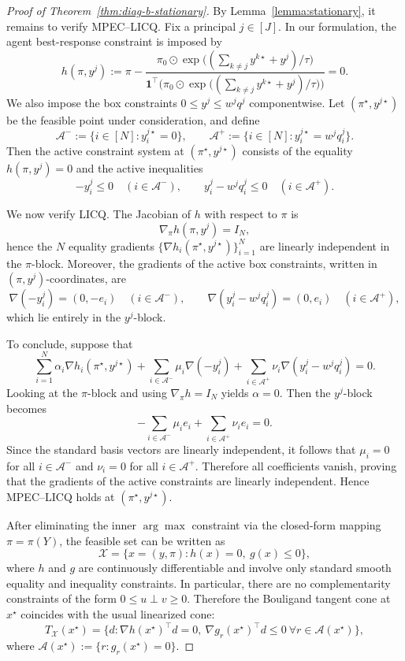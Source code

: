 \documentclass{article}
\begin{document}
\begin{proof}[Proof of Theorem~\ref{thm:diag-b-stationary}]
By Lemma~\ref{lemma:stationary}, it remains to verify MPEC--LICQ.
Fix a principal \(j\in[J]\). In our formulation, the agent best-response constraint is imposed by
\[
h(\pi,y^j)
:= \pi -
\frac{\pi_0\odot \exp\!\big((\sum_{k\neq j} y^{k\star}+y^j)/\tau\big)}
{\mathbf 1^\top\!\Big(\pi_0\odot \exp\!\big((\sum_{k\neq j} y^{k\star}+y^j)/\tau\big)\Big)}
=0 .
\]
We also impose the box constraints \(0\le y^j\le w^jq^j\) componentwise.
Let \((\pi^\star,y^{j\star})\) be the feasible point under consideration, and define
\[
\mathcal A^-:=\{i\in[N]: y_i^{j\star}=0\},
\qquad
\mathcal A^+:=\{i\in[N]: y_i^{j\star}=w^jq_i^j\}.
\]
Then the active constraint system at \((\pi^\star,y^{j\star})\) consists of the equality
\(h(\pi,y^j)=0\) and the active inequalities
\[
-y_i^j\le 0\quad(i\in\mathcal A^-),\qquad
y_i^j-w^jq_i^j\le 0\quad(i\in\mathcal A^+).
\]

We now verify LICQ. The Jacobian of \(h\) with respect to \(\pi\) is
\[
\nabla_{\pi} h(\pi,y^j)=I_N,
\]
hence the \(N\) equality gradients \(\{\nabla h_i(\pi^\star,y^{j\star})\}_{i=1}^N\)
are linearly independent in the \(\pi\)-block. Moreover, the gradients of the active
box constraints, written in \((\pi,y^j)\)-coordinates, are
\[
\nabla(-y_i^j)=(0,-e_i)\quad(i\in\mathcal A^-),\qquad
\nabla(y_i^j-w^jq_i^j)=(0,e_i)\quad(i\in\mathcal A^+),
\]
which lie entirely in the \(y^j\)-block.

To conclude, suppose that
\[
\sum_{i=1}^N \alpha_i \nabla h_i(\pi^\star,y^{j\star})
+\sum_{i\in\mathcal A^-}\mu_i \nabla(-y_i^j)
+\sum_{i\in\mathcal A^+}\nu_i \nabla(y_i^j-w^jq_i^j)
=0.
\]
Looking at the \(\pi\)-block and using \(\nabla_\pi h=I_N\) yields \(\alpha=0\).
Then the \(y^j\)-block becomes
\[
-\sum_{i\in\mathcal A^-}\mu_i e_i + \sum_{i\in\mathcal A^+}\nu_i e_i = 0.
\]
Since the standard basis vectors are linearly independent, it follows that
\(\mu_i=0\) for all \(i\in\mathcal A^-\) and \(\nu_i=0\) for all \(i\in\mathcal A^+\).
Therefore all coefficients vanish, proving that the gradients of the active constraints
are linearly independent. Hence MPEC--LICQ holds at \((\pi^\star,y^{j\star})\).

After eliminating the inner \(\arg\max\) constraint via the closed-form mapping
\(\pi=\pi(Y)\), the feasible set can be written as
\[
\mathcal X=\{x=(y,\pi): h(x)=0,\ g(x)\le 0\},
\]
where \(h\) and \(g\) are continuously differentiable and involve only standard smooth
equality and inequality constraints. In particular, there are no complementarity
constraints of the form \(0\le u \perp v\ge 0\). Therefore the Bouligand tangent cone
at \(x^\star\) coincides with the usual linearized cone:
\[
T_{\mathcal X}(x^\star)
=
\{d:\nabla h(x^\star)^\top d=0,\ \nabla g_r(x^\star)^\top d\le 0\ \forall r\in\mathcal A(x^\star)\},
\]
where \(\mathcal A(x^\star):=\{r:g_r(x^\star)=0\}\).


\end{proof}
\end{document}
